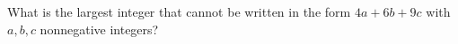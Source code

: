 What is the largest integer that cannot be written in the form $4a+6b+9c$ with $a,b,c$ nonnegative integers?
